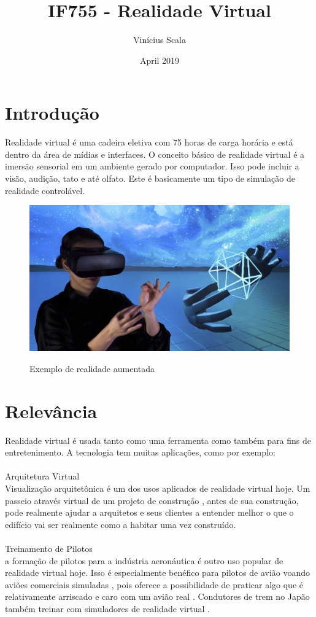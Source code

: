 \documentclass[10pt]{article}
\title{IF755 - Realidade Virtual}
\author{Vinícius Scala}
\date{April 2019}
\begin{document}
\maketitle

\section{Introdução}
Realidade virtual é uma cadeira eletiva com 75 horas de carga horária e está dentro da área de mídias e interfaces.
O conceito básico de realidade virtual é a imersão sensorial em um ambiente gerado por computador. Isso pode incluir a visão, audição, tato e até olfato. Este é basicamente um tipo de simulação de realidade controlável.\cite{intro}


\begin{figure}[h!]
\centering
\includegraphics[scale=0.3]{vsob.jpg}
\caption{Exemplo de realidade aumentada}\cite{imagem}
\label{fig:vsob}
\end{figure}

\section{Relevância}
Realidade virtual é usada tanto como uma ferramenta como também para fins de entretenimento. A tecnologia tem muitas aplicações, como por exemplo:\\\\
Arquitetura Virtual \\
Visualização arquitetônica é um dos usos aplicados de realidade virtual hoje. Um passeio através virtual de um projeto de construção , antes de sua construção, pode realmente ajudar a arquitetos e seus clientes a entender melhor o que o edifício vai ser realmente como a habitar uma vez construído.\cite{importancia} \\\\
Treinamento de Pilotos \\
a formação de pilotos para a indústria aeronáutica é outro uso popular de realidade virtual hoje. Isso é especialmente benéfico para pilotos de avião voando aviões comerciais simuladas , pois oferece a possibilidade de praticar algo que é relativamente arriscado e caro com um avião real . Condutores de trem no Japão também treinar com simuladores de realidade virtual . \cite{importancia}
\end{document}
